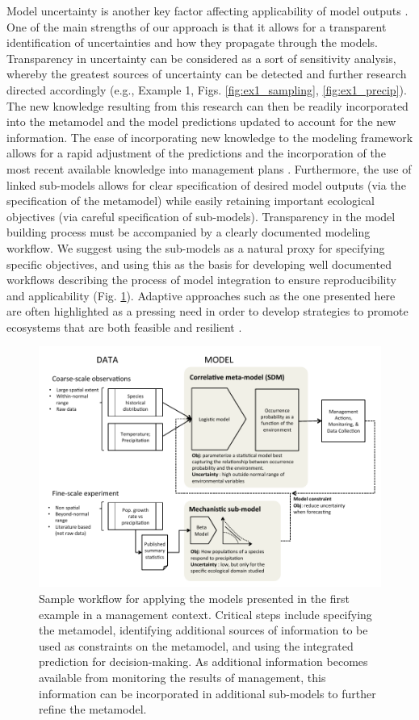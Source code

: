 \documentclass[11pt]{article}
\begin{document}
Model uncertainty is another key factor affecting applicability of model outputs \citep{Addison2013}.
One of the main strengths of our approach is that it allows for a transparent identification of uncertainties and how they propagate through the models. 
Transparency in uncertainty can be considered as a sort of sensitivity analysis, whereby the greatest sources of uncertainty can be detected and further research directed accordingly (e.g., Example 1, Figs. \ref{fig:ex1_sampling}, \ref{fig:ex1_precip}).
The new knowledge resulting from this research can then be readily incorporated into the metamodel and the model predictions updated to account for the new information. 
The ease of incorporating new knowledge to the modeling framework allows for a rapid adjustment of the predictions and the incorporation of the most recent available knowledge into management plans \citep{Keith2011}.
Furthermore, the use of linked sub-models allows for clear specification of desired model outputs (via the specification of the metamodel) while easily retaining important ecological objectives (via careful specification of sub-models).
Transparency in the model building process must be accompanied by a clearly documented modeling workflow.
We suggest using the sub-models as a natural proxy for specifying specific objectives, and using this as the basis for developing well documented workflows describing the process of model integration to ensure reproducibility and applicability (Fig. \ref{fig:management}). 
Adaptive approaches such as the one presented here are often highlighted as a pressing need in order to develop strategies to promote ecosystems that are both feasible and resilient \citep{Seastedt2008}.

\begin{figure}[t]
	\includegraphics{figs/management.pdf}
	\caption{Sample workflow for applying the models presented in the first example in a management context.
	Critical steps include specifying the metamodel, identifying additional sources of information to be used as constraints on the metamodel, and using the integrated prediction for decision-making.
	As additional information becomes available from monitoring the results of management, this information can be incorporated in additional sub-models to further refine the metamodel.}
	\label{fig:management}
\end{figure}
\end{document}
